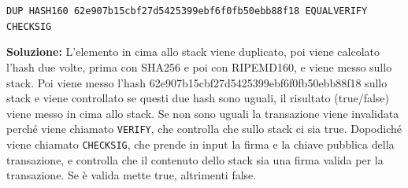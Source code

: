 \begin{center}
    \texttt{DUP HASH160 62e907b15cbf27d5425399ebf6f0fb50ebb88f18
EQUALVERIFY CHECKSIG}
\end{center}

\textbf{Soluzione:} L'elemento in cima allo stack viene duplicato, poi viene calcolato l'hash due volte, prima con SHA256 e poi con RIPEMD160, e viene messo sullo stack. Poi viene messo l'hash 62e907b15cbf27d5425399ebf6f0fb50ebb88f18 sullo stack e viene controllato se questi due hash sono uguali, il risultato (true/false) viene messo in cima allo stack. Se non sono uguali la transazione viene invalidata perché viene chiamato \texttt{VERIFY}, che controlla che sullo stack ci sia true. Dopodiché viene chiamato \texttt{CHECKSIG}, che prende in input la firma e la chiave pubblica della transazione, e controlla che il contenuto dello stack sia una firma valida per la transazione. Se è valida mette true, altrimenti false.


